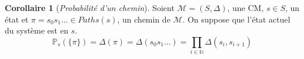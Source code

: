 \documentclass[12pt,a4paper]{report}
\theoremstyle{definition}%
\newtheorem{corollaire}{Corollaire}[chapter]
\theoremstyle{remark}
\newcommand{\pr}{\mathbb{P}}
\begin{document}
\begin{corollaire}[\textit{Probabilité d'un chemin}]
	Soient $\mathcal{M}=(S, \Delta)$, une CM, $s \in S$, un état et $\pi = s_0 s_1 \dots \in Paths(s)$, un chemin de $\mathcal{M}$. On suppose que l'état actuel du système est en $s$.
	\[ \pr_{s}(\{\pi\}) = \Delta(\pi) = \Delta(s_0 s_1 \dots) = \prod_{i \in \mathbb{N}} \Delta(s_i, s_{i+1}) \]
\end{corollaire}
\end{document}
